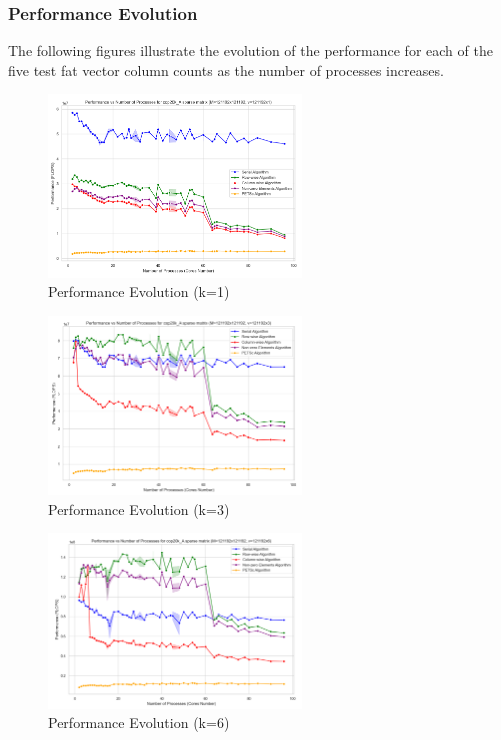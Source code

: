 \documentclass[12pt,oneside]{book} %
\begin{document}
\subsubsection{Performance Evolution}

The following figures illustrate the evolution of the performance for each of
the five test fat vector column counts as the number of processes increases.

\begin{figure}[H]
    \centering
    \includegraphics[width=0.6\textwidth]{../results/fat_vector_dim/cop20k_A_k1_performance.png}
    \caption{Performance Evolution (k=1)}\label{fig:cop20k-a-k1-performance}
\end{figure}

\begin{figure}[H]
    \centering
    \includegraphics[width=0.6\textwidth]{../results/fat_vector_dim/cop20k_A_k3_performance.png}
    \caption{Performance Evolution (k=3)}\label{fig:cop20k-a-k3-performance}
\end{figure}

\begin{figure}[H]
    \centering
    \includegraphics[width=0.6\textwidth]{../results/fat_vector_dim/cop20k_A_k6_performance.png}
    \caption{Performance Evolution (k=6)}\label{fig:cop20k-a-k6-performance}
\end{figure}
\end{document}
